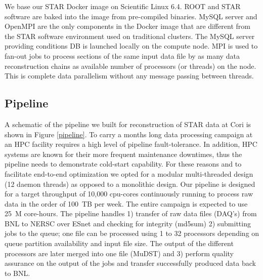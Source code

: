 \documentclass[a4paper]{jpconf}
\begin{document}
We base our STAR Docker image on Scientific Linux 6.4. ROOT \cite{root} and STAR software
are baked into the image from pre-compiled binaries. MySQL server and OpenMPI
are the only components in the Docker image that are different from the STAR
software environment used on traditional clusters. The MySQL server providing 
conditions DB is launched locally on the compute node. MPI is used to fan-out 
jobs to process sections of the same input data file by as many data
reconstruction chains as available number of processors (or threads) on the
node. This is complete data parallelism without any message passing between threads.

\subsection{Pipeline}

A schematic of the pipeline we built for reconstruction of STAR data at Cori is
shown in Figure \ref{pipeline}. To carry a months long data processing campaign at
an HPC facility requires a high level of pipeline fault-tolerance. In addition,
HPC systems are known for their more frequent maintenance downtimes, thus the
pipeline needs to demonstrate cold-start capability. For these reasons and to
facilitate end-to-end optimization we opted for a modular multi-threaded design
(12 daemon threads) as opposed to a monolithic design. Our pipeline is designed
for a target throughput of 10,000 cpu-cores continuously running to process raw
data in the order of 100~TB per week. The entire campaign is expected to use
25~M core-hours.  The pipeline handles 1) transfer of raw data files (DAQ's)
from BNL to NERSC over ESnet and checking for integrity (md5sum) 2) submitting jobs to
the queue; one file can be processed using 1 to 32 processors depending on
queue partition availability and input file size. The output of the different
processors are later merged into one file (MuDST) and 3) perform quality
assurance on the output of the jobs and transfer successfully produced data back
to BNL. 
\end{document}
